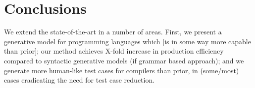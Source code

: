 \section{Conclusions}\label{sec:conclusion}

We extend the state-of-the-art in a number of areas. First, we present a generative model for programming languages which [is in some way more capable than prior];
%
our method achieves X-fold increase in production efficiency compared to syntactic generative models (if grammar based approach);
%
and we generate more human-like test cases for compilers than prior, in (some/most) cases eradicating the need for test case reduction.